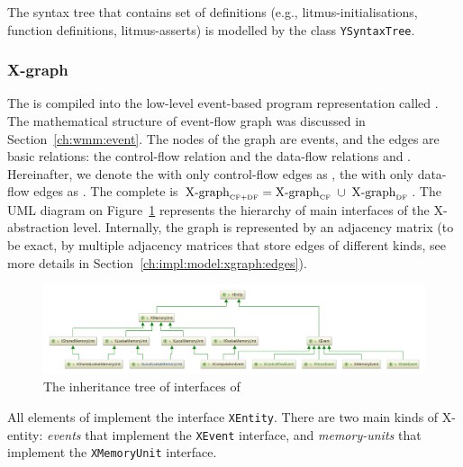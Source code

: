 The syntax tree that contains set of definitions (e.g., litmus-initialisations, function definitions, litmus-asserts) is modelled by the class \texttt{YSyntaxTree}.


\subsubsection{X-graph}
\label{ch:impl:model:xgraph}

The \ytree{} is compiled into the low-level event-based program representation called \textit{\xgraph{}}.
The mathematical structure of event-flow graph was discussed in Section~\ref{ch:wmm:event}.
The nodes of the graph are events, and the edges are basic relations: the control-flow relation \po{} and the data-flow relations \co{} and \rf{}.
Hereinafter, we denote the \xgraph{} with only control-flow edges as \xgraph[CF], the \xgraph{} with only data-flow edges as \xgraph[CF].
The complete \xgraph{} is $\xgraph[CF+DF] = \xgraph[CF] \; \cup \; \xgraph[DF]$.
The UML diagram on Figure~\ref{fig:class-diagrams:XEntity-interfaces} represents the hierarchy of main interfaces of the X-abstraction level.
Internally, the graph is represented by an adjacency matrix (to be exact, by multiple adjacency matrices that store edges of different kinds, see more details in Section~\ref{ch:impl:model:xgraph:edges}).

\begin{figure}[t]%
  \centering
  \includegraphics[width=\textwidth,keepaspectratio]{img/my/class-diagrams/XEntity-interfaces.png}
  \caption{The inheritance tree of interfaces of \xgraph{}}
  \label{fig:class-diagrams:XEntity-interfaces}
\end{figure}

All elements of \xgraph{} implement the interface \texttt{XEntity}.
There are two main kinds of X-entity: \textit{events} that implement the \texttt{XEvent} interface, and \textit{memory-units} that implement the \texttt{XMemoryUnit} interface.

